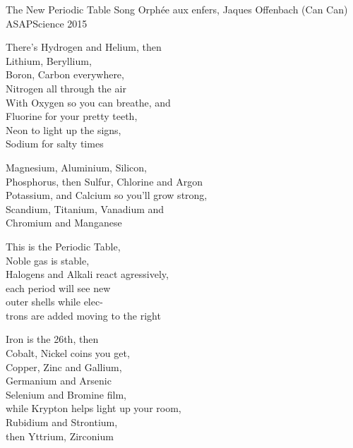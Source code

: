 \begin{song}{The New Periodic Table Song}
  {} %
  {Orphée aux enfers, Jaques Offenbach (Can Can)} %
  {ASAPScience} %
  {2015} %
  {\NotCCLIed} %

  \begin{SBVerse}
    There's Hydrogen and Helium, then\\
    Lithium, Beryllium,\\
    Boron, Carbon everywhere,\\
    Nitrogen all through the air\\
    With Oxygen so you can breathe, and\\
    Fluorine for your pretty teeth,\\
    Neon to light up the signs,\\
    Sodium for salty times
  \end{SBVerse}
     
  \begin{SBVerse}
    Magnesium, Aluminium, Silicon,\\
    Phosphorus, then Sulfur, Chlorine and Argon\\
    Potassium, and Calcium so you'll grow strong,\\
    Scandium, Titanium, Vanadium and\\
    Chromium and Manganese
  \end{SBVerse}
     
  \begin{SBChorus}
    This is the Periodic Table,\\
    Noble gas is stable,\\
    Halogens and Alkali react agressively,\\
    each period will see new\\
    outer shells while elec-\\
    trons are added moving to the right\\
  \end{SBChorus}
     
  \begin{SBVerse}
    Iron is the 26th, then\\
    Cobalt, Nickel coins you get,\\
    Copper, Zinc and Gallium,\\
    Germanium and Arsenic\\
    Selenium and Bromine film,\\
    while Krypton helps light up your room,\\
    Rubidium and Strontium,\\
    then Yttrium, Zirconium
  \end{SBVerse}
     

\end{song}
